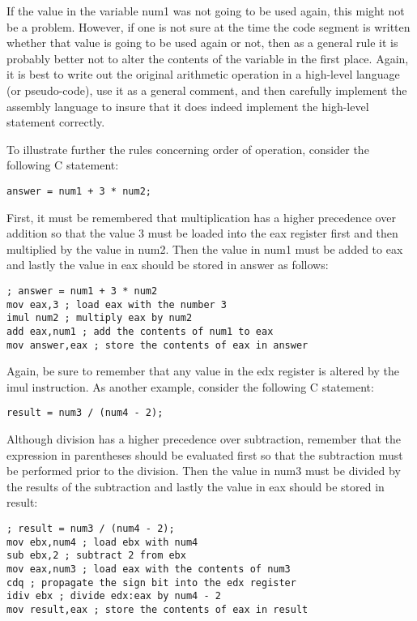 \documentclass[10pt]{article}
\begin{document}
If the value in the variable num1 was not going to be used again, this might not be a problem. However, if one is not sure at the time the code segment is written whether that value is going to be used again or not, then as a general rule it is probably better not to alter the contents of the variable in the first place. Again, it is best to write out the original arithmetic operation in a high-level language (or pseudo-code), use it as a general comment, and then carefully implement the assembly language to insure that it does indeed implement the high-level statement correctly.

To illustrate further the rules concerning order of operation, consider the following C statement:

\begin{verbatim}
answer = num1 + 3 * num2;
\end{verbatim}

First, it must be remembered that multiplication has a higher precedence over addition so that the value 3 must be loaded into the eax register first and then multiplied by the value in num2. Then the value in num1 must be added to eax and lastly the value in eax should be stored in answer as follows:

\begin{verbatim}
; answer = num1 + 3 * num2
mov eax,3 ; load eax with the number 3
imul num2 ; multiply eax by num2
add eax,num1 ; add the contents of num1 to eax
mov answer,eax ; store the contents of eax in answer
\end{verbatim}

Again, be sure to remember that any value in the edx register is altered by the imul instruction. As another example, consider the following C statement:

\begin{verbatim}
result = num3 / (num4 - 2);
\end{verbatim}

Although division has a higher precedence over subtraction, remember that the expression in parentheses should be evaluated first so that the subtraction must be performed prior to the division. Then the value in num3 must be divided by the results of the subtraction and lastly the value in eax should be stored in result:

\begin{verbatim}
; result = num3 / (num4 - 2);
mov ebx,num4 ; load ebx with num4
sub ebx,2 ; subtract 2 from ebx
mov eax,num3 ; load eax with the contents of num3
cdq ; propagate the sign bit into the edx register
idiv ebx ; divide edx:eax by num4 - 2
mov result,eax ; store the contents of eax in result
\end{verbatim}
\end{document}
